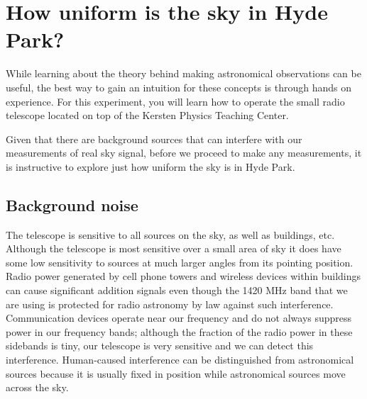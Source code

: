 \section{How uniform is the sky in Hyde Park?} %

While learning about the theory behind making astronomical observations can be useful, the best way to gain an intuition for these concepts is through hands on experience. For this experiment, you will learn how to operate the small radio telescope located on top of the Kersten Physics Teaching Center.

Given that there are background sources that can interfere with our
measurements of real sky signal, before we proceed to make any measurements,
it is instructive to explore just how uniform the sky is in Hyde Park.

\subsection{Background noise}

The telescope is sensitive to all sources on the sky, as well as buildings, etc.
Although the telescope is most sensitive over a small area of sky it does have
some low sensitivity to sources at much larger angles from its pointing position.
Radio power generated by cell phone towers and wireless devices within
buildings can cause significant addition signals even though the 1420 MHz band
that we are using is protected for radio astronomy by law against such
interference. Communication devices operate near our frequency and do not
always suppress power in our frequency bands; although the fraction of the radio
power in these sidebands is tiny, our telescope is very sensitive and we can
detect this interference. Human-caused interference can be distinguished from
astronomical sources because it is usually fixed in position while astronomical
sources move across the sky.




